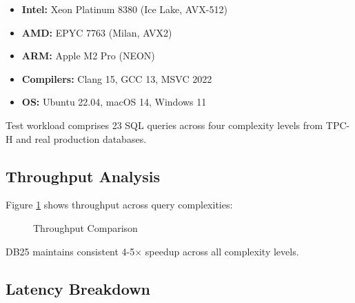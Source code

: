 \documentclass[conference]{IEEEtran}
\begin{document}
\begin{itemize}
\item \textbf{Intel:} Xeon Platinum 8380 (Ice Lake, AVX-512)
\item \textbf{AMD:} EPYC 7763 (Milan, AVX2)
\item \textbf{ARM:} Apple M2 Pro (NEON)
\item \textbf{Compilers:} Clang 15, GCC 13, MSVC 2022
\item \textbf{OS:} Ubuntu 22.04, macOS 14, Windows 11
\end{itemize}

Test workload comprises 23 SQL queries across four complexity levels from TPC-H and real production databases.

\subsection{Throughput Analysis}

Figure \ref{fig:throughput} shows throughput across query complexities:

\begin{figure}[htbp]
\centering
{}
\caption{Throughput Comparison}
\label{fig:throughput}
\end{figure}

DB25 maintains consistent 4-5$\times$ speedup across all complexity levels.

\subsection{Latency Breakdown}
\end{document}
